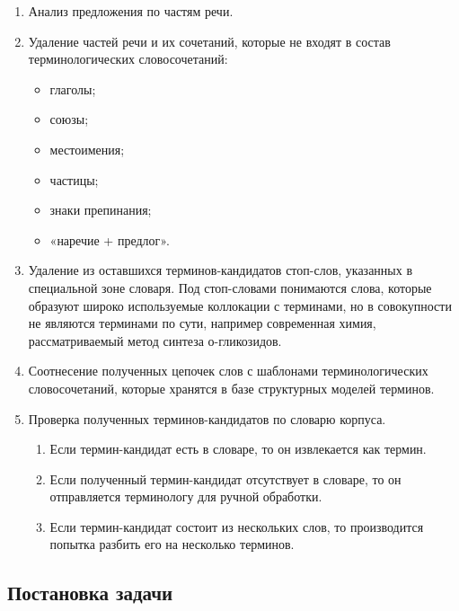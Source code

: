 \begin{enumerate}[label*=\arabic*.]
	\item Анализ предложения по частям речи.
	\item Удаление частей речи и их сочетаний, которые не входят в состав терминологических словосочетаний:
	
	\begin{itemize}[label*=---]
		\item глаголы;
		\item союзы;
		\item местоимения;
		\item частицы;
		\item знаки препинания;
		\item «наречие + предлог».
		
	\end{itemize}
	
	\item Удаление из оставшихся терминов-кандидатов стоп-слов, указанных в специальной зоне словаря. Под стоп-словами понимаются слова, которые образуют широко используемые коллокации с терминами, но в совокупности не являются терминами по сути, например современная химия, рассматриваемый метод синтеза о-гликозидов.
	\item Соотнесение полученных цепочек слов с шаблонами терминологических словосочетаний, которые хранятся в базе структурных моделей терминов.
	\item Проверка полученных терминов-кандидатов по словарю корпуса.
	
	\begin{enumerate}[label*=\arabic*.]
		
	\item Если термин-кандидат есть в словаре, то он извлекается как термин.
	\item Если полученный термин-кандидат отсутствует в словаре, то он отправляется терминологу для ручной обработки.
	\item Если термин-кандидат состоит из нескольких слов, то производится попытка разбить его на несколько терминов.
	
	\end{enumerate}
	
\end{enumerate}



\subsection{Постановка задачи}

